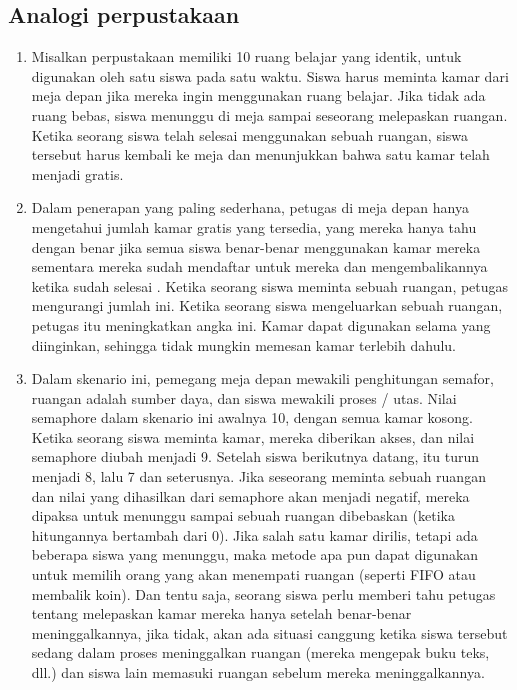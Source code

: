 \begin{enumerate}
\subsection {Analogi perpustakaan}
	\begin{enumerate}
		\item Misalkan perpustakaan memiliki 10 ruang belajar yang identik, untuk digunakan oleh satu siswa pada satu waktu. Siswa harus meminta kamar dari meja depan jika mereka ingin menggunakan ruang belajar. Jika tidak ada ruang bebas, siswa menunggu di meja sampai seseorang melepaskan ruangan. Ketika seorang siswa telah selesai menggunakan sebuah ruangan, siswa tersebut harus kembali ke meja dan menunjukkan bahwa satu kamar telah menjadi gratis.
		\item Dalam penerapan yang paling sederhana, petugas di meja depan hanya mengetahui jumlah kamar gratis yang tersedia, yang mereka hanya tahu dengan benar jika semua siswa benar-benar menggunakan kamar mereka sementara mereka sudah mendaftar untuk mereka dan mengembalikannya ketika sudah selesai . Ketika seorang siswa meminta sebuah ruangan, petugas mengurangi jumlah ini. Ketika seorang siswa mengeluarkan sebuah ruangan, petugas itu meningkatkan angka ini. Kamar dapat digunakan selama yang diinginkan, sehingga tidak mungkin memesan kamar terlebih dahulu.
		\item Dalam skenario ini, pemegang meja depan mewakili penghitungan semafor, ruangan adalah sumber daya, dan siswa mewakili proses / utas. Nilai semaphore dalam skenario ini awalnya 10, dengan semua kamar kosong. Ketika seorang siswa meminta kamar, mereka diberikan akses, dan nilai semaphore diubah menjadi 9. Setelah siswa berikutnya datang, itu turun menjadi 8, lalu 7 dan seterusnya. Jika seseorang meminta sebuah ruangan dan nilai yang dihasilkan dari semaphore akan menjadi negatif, mereka dipaksa untuk menunggu sampai sebuah ruangan dibebaskan (ketika hitungannya bertambah dari 0). Jika salah satu kamar dirilis, tetapi ada beberapa siswa yang menunggu, maka metode apa pun dapat digunakan untuk memilih orang yang akan menempati ruangan (seperti FIFO atau membalik koin). Dan tentu saja, seorang siswa perlu memberi tahu petugas tentang melepaskan kamar mereka hanya setelah benar-benar meninggalkannya, jika tidak, akan ada situasi canggung ketika siswa tersebut sedang dalam proses meninggalkan ruangan (mereka mengepak buku teks, dll.) dan siswa lain memasuki ruangan sebelum mereka meninggalkannya.
	\end{enumerate}

\end{enumerate}
